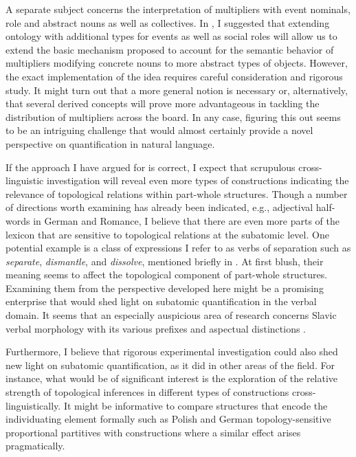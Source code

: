A separate subject concerns the interpretation of multipliers with event nominals, role and abstract nouns as well as collectives. In  , I suggested that extending ontology with additional types for events as well as social roles will allow us to extend the basic mechanism proposed to account for the semantic behavior of multipliers modifying concrete nouns to more abstract types of objects. However, the exact implementation of the idea requires careful consideration and rigorous study. It might turn out that a more general notion is necessary or, alternatively, that several derived concepts will prove more advantageous in tackling the distribution of multipliers across the board. In any case, figuring this out seems to be an intriguing challenge that would almost certainly provide a novel perspective on quantification in natural language.

If the approach I have argued for is correct, I expect that scrupulous cross-linguistic investigation will reveal even more types of constructions indicating the relevance of topological relations within part-whole structures. Though a number of directions worth examining has already been indicated, e.g., adjectival half-words in German and Romance, I believe that there are even more parts of the lexicon that are sensitive to topological relations at the subatomic level. One potential example is a class of expressions I refer to as verbs of separation such as \textit{separate}, \textit{dismantle}, and \textit{dissolve}, mentioned briefly in  . At first blush, their meaning seems to affect the topological component of part-whole structures. Examining them from the perspective developed here might be a promising enterprise that would shed light on subatomic quantification in the verbal domain. It seems that an especially auspicious area of research concerns Slavic verbal morphology with its various prefixes and aspectual distinctions \citep[e.g.,][]{filip1999aspect}.

\begin{sloppypar}
Furthermore, I believe that rigorous experimental investigation could also shed new light on subatomic quantification, as it did in other areas of the field. For instance, what would be of significant interest is the exploration of the relative strength of topological inferences in different types of constructions cross-linguistically. It might be informative to compare structures that encode the individuating element formally such as Polish and German topology-sensitive proportional partitives with constructions where a similar effect arises pragmatically. 
\end{sloppypar}

